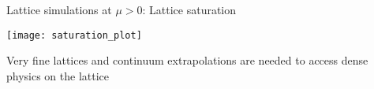 \begin{frame}{Lattice simulations at \texorpdfstring{$\mu > 0$}{m > 0}: Lattice saturation}

  \begin{center}
    \texttt{[image: saturation\_plot]}
  \end{center}

  \vspace{-.2cm}

  Very \alert{fine lattices} and \alert{continuum extrapolations} are needed to
  access dense physics on the lattice

  
\end{frame}
